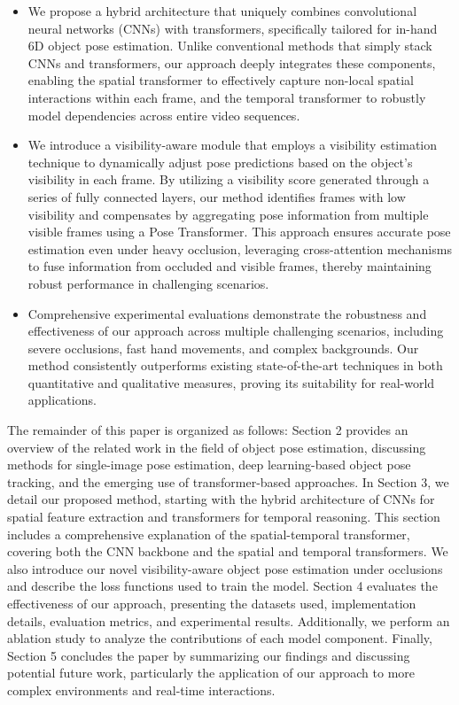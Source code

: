 \begin{itemize}

\item We propose a hybrid architecture that uniquely combines convolutional neural networks (CNNs) with transformers, specifically tailored for in-hand 6D object pose estimation. Unlike conventional methods that simply stack CNNs and transformers, our approach deeply integrates these components, enabling the spatial transformer to effectively capture non-local spatial interactions within each frame, and the temporal transformer to robustly model dependencies across entire video sequences. 

\item We introduce a visibility-aware module that employs a visibility estimation technique to dynamically adjust pose predictions based on the object's visibility in each frame. By utilizing a visibility score generated through a series of fully connected layers, our method identifies frames with low visibility and compensates by aggregating pose information from multiple visible frames using a Pose Transformer. This approach ensures accurate pose estimation even under heavy occlusion, leveraging cross-attention mechanisms to fuse information from occluded and visible frames, thereby maintaining robust performance in challenging scenarios.

\item Comprehensive experimental evaluations demonstrate the robustness and effectiveness of our approach across multiple challenging scenarios, including severe occlusions, fast hand movements, and complex backgrounds. Our method consistently outperforms existing state-of-the-art techniques in both quantitative and qualitative measures, proving its suitability for real-world applications.

\end{itemize}

The remainder of this paper is organized as follows: Section 2 provides an overview of the related work in the field of object pose estimation, discussing methods for single-image pose estimation, deep learning-based object pose tracking, and the emerging use of transformer-based approaches. In Section 3, we detail our proposed method, starting with the hybrid architecture of CNNs for spatial feature extraction and transformers for temporal reasoning. This section includes a comprehensive explanation of the spatial-temporal transformer, covering both the CNN backbone and the spatial and temporal transformers. We also introduce our novel visibility-aware object pose estimation under occlusions and describe the loss functions used to train the model. Section 4 evaluates the effectiveness of our approach, presenting the datasets used, implementation details, evaluation metrics, and experimental results. Additionally, we perform an ablation study to analyze the contributions of each model component. Finally, Section 5 concludes the paper by summarizing our findings and discussing potential future work, particularly the application of our approach to more complex environments and real-time interactions.